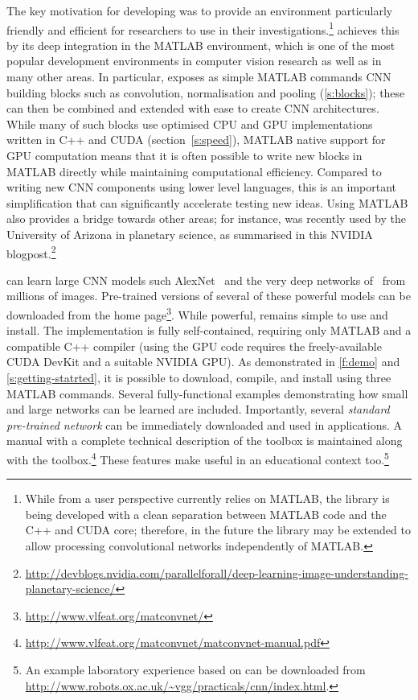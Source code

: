 The key motivation for developing \matconvnet was to provide an environment particularly friendly and efficient for researchers to use in their investigations.\footnote{While from a user perspective \matconvnet currently relies on MATLAB, the library is being developed with a clean separation between MATLAB code and the C++ and CUDA core; therefore, in the future the library may be extended to allow processing convolutional networks independently of MATLAB.} \matconvnet achieves this by its deep integration in the MATLAB environment, which is one of the most popular development environments in computer vision research as well as in many other areas. In particular, \matconvnet exposes as simple MATLAB commands CNN building blocks such as convolution, normalisation and pooling (\autoref{s:blocks}); these can then be combined and extended with ease to create CNN architectures. While many of such blocks use optimised CPU and GPU implementations written in C++ and CUDA (section~\autoref{s:speed}), MATLAB native support for GPU computation means that it is often possible to write new blocks in MATLAB directly while maintaining computational efficiency. Compared to writing new CNN components using lower level languages, this is an important simplification that can significantly accelerate testing new ideas. Using MATLAB also provides a bridge towards other areas; for instance, \matconvnet was recently used by the University of Arizona in planetary science, as summarised in this NVIDIA blogpost.\footnote{\small\url{http://devblogs.nvidia.com/parallelforall/deep-learning-image-understanding-planetary-science/}}

\matconvnet can learn large CNN models such AlexNet~\cite{krizhevsky12imagenet} and the very deep networks of~\cite{simonyan14deep} from millions of images. Pre-trained versions of several of these powerful models can be downloaded from  the \matconvnet home page\footnote{\small\url{http://www.vlfeat.org/matconvnet/}}. While powerful, \matconvnet remains simple to use and install. The implementation is fully self-contained, requiring only MATLAB and a compatible C++ compiler (using the GPU code requires the freely-available CUDA DevKit and a suitable NVIDIA GPU). As demonstrated in \autoref{f:demo} and \autoref{s:getting-statrted}, it is possible to download, compile, and install \matconvnet using three MATLAB commands. Several fully-functional examples demonstrating how small and large networks can be learned are included. Importantly, several \emph{standard pre-trained network} can be immediately downloaded and used in applications. A manual with a complete technical description of the toolbox is maintained along with the toolbox.\footnote{\small\url{http://www.vlfeat.org/matconvnet/matconvnet-manual.pdf}} These features make \matconvnet useful in an educational context too.\footnote{An example laboratory experience based on \matconvnet can be downloaded from {\small\url{http://www.robots.ox.ac.uk/~vgg/practicals/cnn/index.html}}.}

